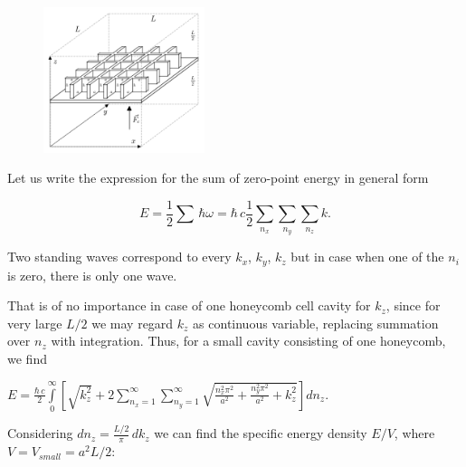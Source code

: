 \documentclass[twoside, 10pt, ptm]{article}
\begin{document}
\begin{multicols}{2}
\begin{figure}
\begin{center}
\includegraphics[width=0.42\textwidth]{honeycomb_box_L.png}
\caption{}{}
\end{center}
\label{fig:honeycomb_box_L}
\end{figure}


Let us write the expression for the sum of zero-point energy in general form

\vspace{-3.5mm}
\begin{equation} \label{eq:1}
E = \frac{1}{2}\sum\,\hbar\omega = \hbar\,c\frac{1}{2}\sum\limits_{n_x}^{}\sum\limits_{n_y}^{}\sum\limits_{n_z}^{}k.
\end{equation}
\vspace{-3.5mm}

    Two standing waves correspond to every \(k_x\), \(k_y\), \(k_z\) but in case when one of the \(n_i\) is zero, there is only one wave.

    That is of no importance in case of one honeycomb cell cavity for \(k_z\),
since for very large \(L/2\) we may regard \(k_z\) as
continuous variable, replacing summation over \(n_z\) with integration.
Thus, for a small cavity consisting of one honeycomb, we find

\noindent
\(E = \frac{\hbar\,c}{2}\int\limits_{0}^{\infty}\left[{\sqrt{k_z^2}+2\sum\limits_{n_x=1}^{\infty}\sum\limits_{n_y=1}^{\infty}\sqrt{\frac{n_x^2 \pi^2}{a^2}+\frac{n_y^2 \pi^2}{a^2}+k_z^2}}\right]d{n_z}\).

   Considering \(dn_z = \frac{L/2}{\pi}\,dk_z\) we can find the specific energy density \(E/V\), where
\(V = V_{small} = a^2 L/2\):



\end{multicols}
\end{document}
